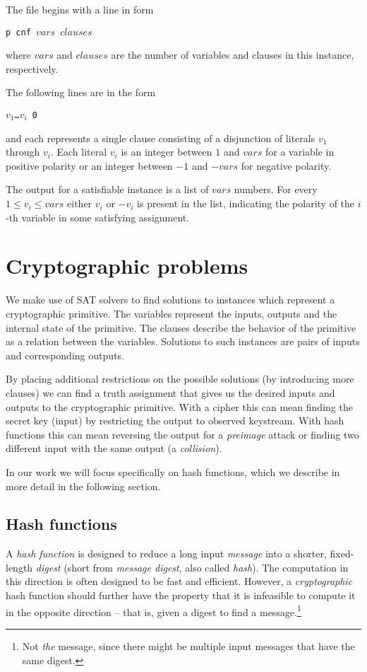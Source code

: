 The file begins with a line in form

\centerline{\texttt{p cnf $vars$ $clauses$}}

\noindent where $vars$ and $clauses$ are the number of variables and clauses in this instance, respectively.

The following lines are in the form

\centerline{\texttt{$v_1$\dots$v_i$ 0}}

\noindent and each represents a single clause consisting of a disjunction of literals $v_1$ through $v_i$.
Each literal $v_i$ is an integer between $1$ and $vars$ for a variable in positive polarity or an integer between $-1$ and $-vars$ for negative polarity.

The output for a satisfiable instance is a list of $vars$ numbers.
For every $1 \le v_i \le vars$ either $v_i$ or $-v_i$ is present in the list, indicating the polarity of the $i$-th variable in some satisfying assignment. 

\section{Cryptographic problems}
We make use of SAT solvers to find solutions to instances which represent a cryptographic primitive.
The variables represent the inputs, outputs and the internal state of the primitive.
The clauses describe the behavior of the primitive as a relation between the variables.
Solutions to such instances are pairs of inputs and corresponding outputs.

By placing additional restrictions on the possible solutions (by introducing more clauses) we can find a truth assignment that gives us the desired inputs and outputs to the cryptographic primitive.
With a cipher this can mean finding the secret key (input) by restricting the output to observed keystream.
With hash functions this can mean reversing the output for a \emph{preimage} attack or finding two different input with the same output (a \emph{collision}).

In our work we will focus specifically on hash functions, which we describe in more detail in the following section.

\subsection{Hash functions}
A \emph{hash function} is designed to reduce a long input \emph{message} into a shorter, fixed-length \emph{digest} (short from \emph{message digest}, also called \emph{hash}).
The computation in this direction is often designed to be fast and efficient.
However, a \emph{cryptographic} hash function should further have the property that it is infeasible to compute it in the opposite direction -- that is, given a digest to find a message.\footnote{Not \emph{the} message, since there might be multiple input messages that have the same digest.}

